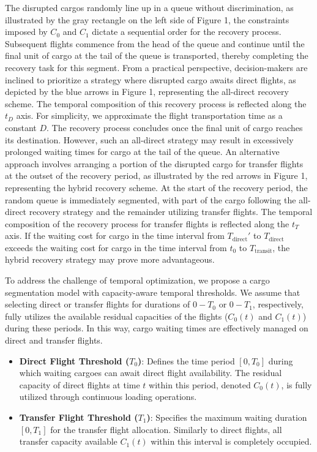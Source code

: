 \documentclass[opre,sglanonrev]{informs4}
\begin{document}
The disrupted cargos randomly line up in a queue without discrimination, %
as illustrated by the gray rectangle on the left side of Figure 1, the constraints %
imposed by $C_0$ and $C_1$ dictate a sequential order for the recovery process. %
Subsequent flights commence from the head of the queue and continue until the final %
unit of cargo at the tail of the queue is transported, thereby completing the recovery %
task for this segment. From a practical perspective, decision-makers are inclined to %
prioritize a strategy where disrupted cargo awaits direct flights, as depicted by the blue %
arrows in Figure 1, representing the all-direct recovery scheme. The temporal composition %
of this recovery process is reflected along the $t_D$ axis. For simplicity, we approximate %
the flight transportation time as a constant $D$. The recovery process concludes once the %
final unit of cargo reaches its destination. However, such an all-direct strategy may result %
in excessively prolonged waiting times for cargo at the tail of the queue. An alternative %
approach involves arranging a portion of the disrupted cargo for transfer flights at the %
outset of the recovery period, as illustrated by the red arrows in Figure 1, representing %
the hybrid recovery scheme. At the start of the recovery period, the random queue is %
immediately segmented, with part of the cargo following the all-direct recovery strategy %
and the remainder utilizing transfer flights. The temporal composition of the recovery %
process for transfer flights is reflected along the $t_T$ axis. If the waiting cost for %
cargo in the time interval from $T_{\text{direct}}'$ to $T_{\text{direct}}$ exceeds the %
waiting cost for cargo in the time interval from $t_0$ to $T_{\text{transit}}$, the hybrid %
recovery strategy may prove more advantageous.

To address the challenge of temporal optimization, we propose a cargo segmentation model with capacity-aware temporal thresholds. We assume that selecting direct or transfer flights for durations of \(0 - T_0\) or \(0 - T_1\), respectively, fully utilizes the available residual capacities of the flights (\(C_0(t)\) and \(C_1(t)\)) during these periods. In this way, cargo waiting times are effectively managed on direct and transfer flights.

\begin{itemize}
    \item \textbf{Direct Flight Threshold ($T_0$)}: Defines the time period $[0, T_0]$ during which waiting cargoes can await direct flight availability. The residual capacity of direct flights at time $t$ within this period, denoted $C_0(t)$, is fully utilized through continuous loading operations.
    
    \item \textbf{Transfer Flight Threshold ($T_1$)}: Specifies the maximum waiting duration $[0, T_1]$ for the transfer flight allocation. Similarly to direct flights, all transfer capacity available $C_1(t)$ within this interval is completely occupied.
\end{itemize}
\end{document}
